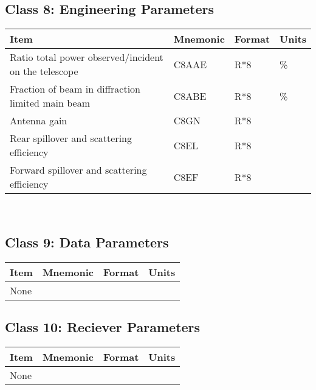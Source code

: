 \subsection{Class 8: Engineering Parameters}


\begin{tabular}{||l|l|l|l||} \hline
Item                                                 & Mnemonic & Format & Units \\ \hline
Ratio total power observed/incident on the telescope & C8AAE    & R*8    & \%    \\      
Fraction of beam in diffraction limited main beam    & C8ABE    & R*8    & \%    \\      
Antenna gain                                         & C8GN     & R*8    &  ~    \\      
Rear spillover and scattering efficiency             & C8EL     & R*8    &  ~    \\      
Forward spillover and scattering efficiency          & C8EF     & R*8    &  ~    \\  \hline
\end{tabular}
 \\



\subsection{Class 9: Data Parameters}

\begin{tabular}{||l|l|l|l||} \hline
Item                      & Mnemonic & Format & Units \\ \hline
   None                   &   ~      &   ~    &  ~    \\ \hline
\end{tabular}

                                                                                



\subsection{Class 10: Reciever Parameters}

\begin{tabular}{||l|l|l|l||} \hline
Item                      & Mnemonic & Format & Units \\ \hline
 None                     &    ~     &  ~     &  ~    \\ \hline
\end{tabular}

